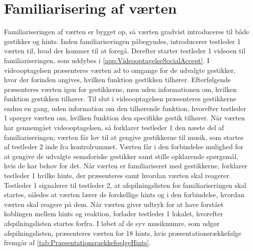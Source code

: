 \section{Familiarisering af værten}
\label{FamiliariseringSocialAccept}
% 
Familiariseringen af værten er bygget op, så værten gradvist introduceres til både gestikker og hints. Inden familiariseringen påbegyndes, introducerer testleder 1 værten til, hvad der kommer til at foregå. Derefter starter testleder 1 videoen til familiariseringen, som uddybes i \autoref{app:VideooptagelseSocialAccept}. I videooptagelsen præsenteres værten ad to omgange for de udvalgte gestikker, hvor der forinden angives, hvilken funktion gestikken tilhører. Efterfølgende præsenteres værten igen for gestikkerne, men uden informationen om, hvilken funktion gestikken tilhører. Til slut i videooptagelsen præsenteres gestikkerne endnu en gang, uden information om den tilhørende funktion, hvorefter testleder 1 spørger værten om, hvilken funktion den specifikke gestik tilhører. Når værten har gennemgået videooptagelsen, så forklarer testleder 1 den næste del af familiariseringen; værten får lov til at gengive gestikkerne til musik, som startes af testleder 2 inde fra kontrolrummet. Værten får i den forbindelse mulighed for at gengive de udvalgte semaforiske gestikker samt stille opklarende spørgsmål, hvis de har behov for det. Når værten er familiariseret med gestikkerne, forklarer testleder 1 hvilke hints, der præsenteres samt hvordan værten skal reagerer. Testleder 1 signalerer til testleder 2, at afspilningslisten for familiariseringen skal startes, således at værten lærer de forskellige hints og i den forbindelse, hvordan værten skal reagere på dem. Når værten giver udtryk for at have forstået koblingen mellem hints og reaktion, forlader testleder 1 lokalet, hvorefter afspilningslisten startes forfra. I løbet af de syv musiknumre, som udgør afspilningslisten, præsenteres værten for 18 hints, hvis præsentationsrækkefølge fremgår af \autoref{tab:PraesentationsraekkefoelgeHints}.

